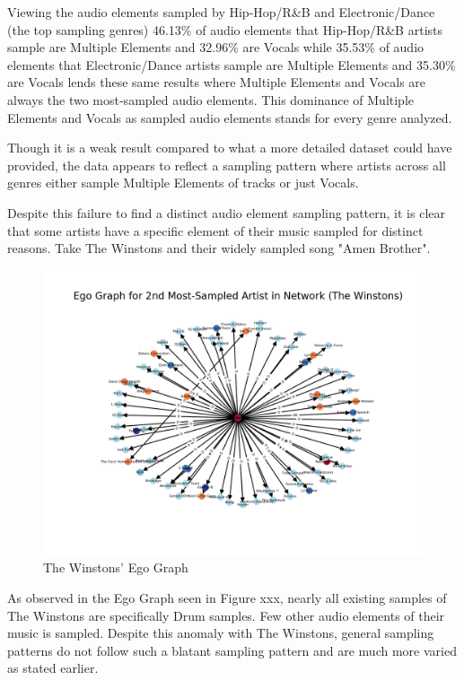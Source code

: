 \documentclass[pageno]{jpaper}
\begin{document}
Viewing the audio elements sampled by Hip-Hop/R\&B and Electronic/Dance (the top sampling genres) 46.13\% of audio elements that Hip-Hop/R\&B artists sample are Multiple Elements and 32.96\% are Vocals while 35.53\% of audio elements that Electronic/Dance artists sample are Multiple Elements and 35.30\% are Vocals lends these same results where Multiple Elements and Vocals are always the two most-sampled audio elements. This dominance of Multiple Elements and Vocals as sampled audio elements stands for every genre analyzed.

Though it is a weak result compared to what a more detailed dataset could have provided, the data appears to reflect a sampling pattern where artists across all genres either sample Multiple Elements of tracks or just Vocals.

Despite this failure to find a distinct audio element sampling pattern, it is clear that some artists have a specific element of their music sampled for distinct reasons. Take The Winstons and their widely sampled song "Amen Brother".
\begin{figure}[H]
\includegraphics{./EgoGraphs/egoGraphMostSampled2TheWinstons}
\caption{The Winstons' Ego Graph}
\centering
\end{figure}
As observed in the Ego Graph seen in Figure xxx, nearly all existing samples of The Winstons are specifically Drum samples. Few other audio elements of their music is sampled. Despite this anomaly with The Winstons, general sampling patterns do not follow such a blatant sampling pattern and are much more varied as stated earlier.
\end{document}
